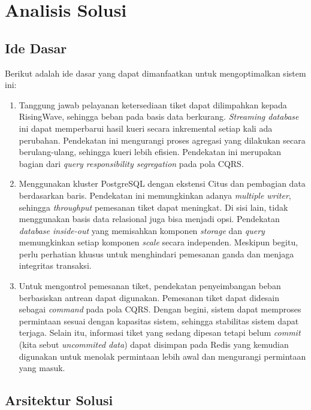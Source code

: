 \section{Analisis Solusi}

\subsection{Ide Dasar}

Berikut adalah ide dasar yang dapat dimanfaatkan untuk mengoptimalkan sistem ini:

\begin{enumerate}
  \item Tanggung jawab pelayanan ketersediaan tiket dapat dilimpahkan kepada RisingWave, sehingga beban pada basis data berkurang. \textit{Streaming database} ini dapat memperbarui hasil kueri secara inkremental setiap kali ada perubahan. Pendekatan ini mengurangi proses agregasi yang dilakukan secara berulang-ulang, sehingga kueri lebih efisien. Pendekatan ini merupakan bagian dari \textit{query responsibility segregation} pada pola CQRS.
  \item Menggunakan kluster PostgreSQL dengan ekstensi Citus dan pembagian data berdasarkan baris. Pendekatan ini memungkinkan adanya \textit{multiple writer}, sehingga \textit{throughput} pemesanan tiket dapat meningkat. Di sisi lain, tidak menggunakan basis data relasional juga bisa menjadi opsi. Pendekatan \textit{database inside-out} yang memisahkan komponen \textit{storage} dan \textit{query} memungkinkan setiap komponen \textit{scale} secara independen. Meskipun begitu, perlu perhatian khusus untuk menghindari pemesanan ganda dan menjaga integritas transaksi.
  \item Untuk mengontrol pemesanan tiket, pendekatan penyeimbangan beban berbasiskan antrean dapat digunakan. Pemesanan tiket dapat didesain sebagai \textit{command} pada pola CQRS. Dengan begini, sistem dapat memproses permintaan sesuai dengan kapasitas sistem, sehingga stabilitas sistem dapat terjaga. Selain itu, informasi tiket yang sedang dipesan tetapi belum \textit{commit} (kita sebut \textit{uncommited data}) dapat disimpan pada Redis yang kemudian digunakan untuk menolak permintaan lebih awal dan mengurangi permintaan yang masuk.
\end{enumerate}

\subsection{Arsitektur Solusi}


